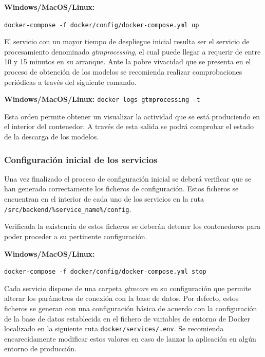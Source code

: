 \vspace{0.5cm}
\centerline{\textbf{Windows/MacOS/Linux:}}
\centerline{\texttt{docker-compose -f docker/config/docker-compose.yml up}}
\vspace{0.4cm}

El servicio con un mayor tiempo de despliegue inicial resulta ser el servicio de procesamiento denominado \textit{gtmprocessing}, el cual puede llegar a requerir de entre 10 y 15 minutos en su arranque. Ante la pobre vivacidad que se presenta en el proceso de obtención de los modelos se recomienda realizar comprobaciones periódicas a través del siguiente comando.

\vspace{0.5cm}
\centerline{\textbf{Windows/MacOS/Linux: } \texttt{docker logs gtmprocessing -t}}
\vspace{0.4cm}

Esta orden permite obtener un visualizar la actividad que se está produciendo en el interior del contenedor. A través de esta salida se podrá comprobar el estado de la descarga de los modelos.

\subsubsection{Configuración inicial de los servicios}

Una vez finalizado el proceso de configuración inicial se deberá verificar que se han generado correctamente los ficheros de configuración. Estos ficheros se encuentran en el interior de cada uno de los servicios en la ruta \texttt{/src/backend/\%service\_name\%/config}.

Verificada la existencia de estos ficheros se deberán detener los contenedores para poder proceder a su pertinente configuración.

\vspace{0.5cm}
\centerline{\textbf{Windows/MacOS/Linux:}}
\centerline{\texttt{docker-compose -f docker/config/docker-compose.yml stop}}
\vspace{0.4cm}

Cada servicio dispone de una carpeta \textit{gtmcore} en su configuración que permite alterar los parámetros de conexión con la base de datos. Por defecto, estos ficheros se generan con una configuración básica de acuerdo con la configuración de la base de datos establecida en el fichero de variables de entorno de Docker localizado en la siguiente ruta \texttt{docker/services/.env}. Se recomienda encarecidamente modificar estos valores en caso de lanzar la aplicación en algún entorno de producción.

